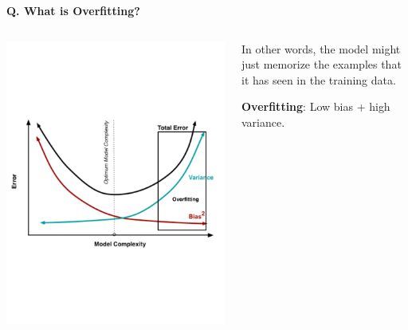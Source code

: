 \begin{frame}[fragile]{\textbf{Q. What is Overfitting?}}
\begin{columns}[T]
\begin{column}{.58\textwidth}
{{        \includegraphics{figures/overfit.pdf}
      }
    }
  \end{column}
  \hfill
  \begin{column}{.4\textwidth}
    \footnotesize
    \begin{wideitemize}
      \item<1-> In other words, the model might just memorize the examples that it has seen in
      the training data.\medskip
      \item<2-> \textbf{Overfitting}: Low bias + high variance.
    \end{wideitemize}
    \end{column}
  \end{columns}


\end{frame}
